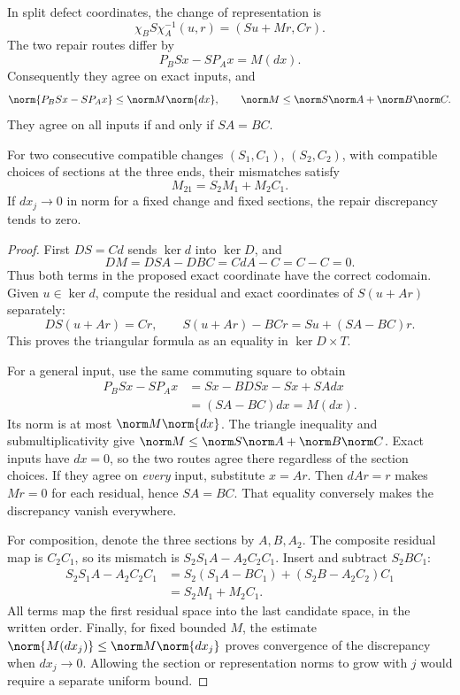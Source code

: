 \begin{theorem}\label{KS66}
In split defect coordinates, the change of representation is
\begin{equation}\label{eq:triangular-chart}
 \chi_BS\chi_A^{-1}(u,r)=(Su+Mr,Cr).
\end{equation}
The two repair routes differ by
\begin{equation}\label{eq:repair-change}
 P_BSx-SP_Ax=M(dx).
\end{equation}
Consequently they agree on exact inputs, and
\[
 \norm{P_BSx-SP_Ax}\le\norm M\norm{dx},
 \qquad \norm M\le\norm S\norm A+\norm B\norm C.
\]
They agree on all inputs if and only if \(SA=BC\).

For two consecutive compatible changes \((S_1,C_1)\), \((S_2,C_2)\), with compatible choices of sections at the three ends, their mismatches satisfy
\[
 M_{21}=S_2M_1+M_2C_1.
\]
If \(dx_j\to0\) in norm for a fixed change and fixed sections, the repair discrepancy tends to zero.
\end{theorem}
\begin{proof}
First \(DS=Cd\) sends \(\ker d\) into \(\ker D\), and
\[
 DM=DSA-DBC=CdA-C=C-C=0.
\]
Thus both terms in the proposed exact coordinate have the correct codomain. Given \(u\in\ker d\), compute the residual and exact coordinates of \(S(u+Ar)\) separately:
\[
 DS(u+Ar)=Cr,\qquad
 S(u+Ar)-BCr=Su+(SA-BC)r.
\]
This proves the triangular formula as an equality in \(\ker D\times T\).

For a general input, use the same commuting square to obtain
\[
 \begin{aligned}
 P_BSx-SP_Ax
 &=Sx-BDSx-Sx+SAdx\\
 &=(SA-BC)dx=M(dx).
 \end{aligned}
\]
Its norm is at most \(\norm M\norm{dx}\). The triangle inequality and submultiplicativity give \(\norm M\le\norm S\norm A+\norm B\norm C\). Exact inputs have \(dx=0\), so the two routes agree there regardless of the section choices. If they agree on \emph{every} input, substitute \(x=Ar\). Then \(dAr=r\) makes \(Mr=0\) for each residual, hence \(SA=BC\). That equality conversely makes the discrepancy vanish everywhere.

For composition, denote the three sections by \(A,B,A_2\). The composite residual map is \(C_2C_1\), so its mismatch is \(S_2S_1A-A_2C_2C_1\). Insert and subtract \(S_2BC_1\):
\[
 \begin{aligned}
 S_2S_1A-A_2C_2C_1
 &=S_2(S_1A-BC_1)+(S_2B-A_2C_2)C_1\\
 &=S_2M_1+M_2C_1.
 \end{aligned}
\]
All terms map the first residual space into the last candidate space, in the written order. Finally, for fixed bounded \(M\), the estimate \(\norm{M(dx_j)}\le\norm M\norm{dx_j}\) proves convergence of the discrepancy when \(dx_j\to0\). Allowing the section or representation norms to grow with \(j\) would require a separate uniform bound.
\end{proof}
